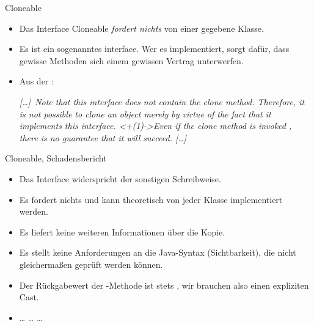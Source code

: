 {\begin{frame}[t,fragile]{Cloneable}
    \begin{itemize}[<+(1)->]
        \itemsep8pt
        \item Das Interface Cloneable \textit{fordert nichts} von einer gegebene Klasse.
        \item Es ist ein sogenanntes  interface.\pause{} Wer es implementiert, sorgt dafür, dass gewisse Methoden sich einem gewissen Vertrag unterwerfen.\smallskip\pause\par{}
        \item Aus der  :\par\pause
        \textit{\textcolor{codeouthl}{[}\ldots\textcolor{codeouthl}{]}~Note that this interface does not contain the clone method.
        Therefore, it is not possible to clone an object merely by virtue of the
        fact that it implements this interface. \onslide<+(1)->{Even if the clone method is invoked , there is no guarantee that it will succeed. \textcolor{codeouthl}{[}\ldots\textcolor{codeouthl}{]}}}
    \end{itemize}
\end{frame}

\begin{frame}[t,fragile]{Cloneable, Schadensbericht}
    \begin{itemize}[<+(1)->]
        \itemsep9pt
        \item Das Interface widerspricht der sonstigen Schreibweise.\pause{} 
        \item Es fordert nichts und kann theoretisch von jeder Klasse implementiert werden.
        \item Es liefert keine weiteren Informationen über die Kopie.
        \item Es stellt keine Anforderungen an die Java-Syntax (Sichtbarkeit), die nicht gleichermaßen geprüft werden können.
        \item Der Rückgabewert der -Methode ist stets , wir brauchen also einen expliziten Cast.\pause{} 
        \item \ldots\pause{} \ldots\pause{} \ldots
    \end{itemize}
\end{frame}

}
